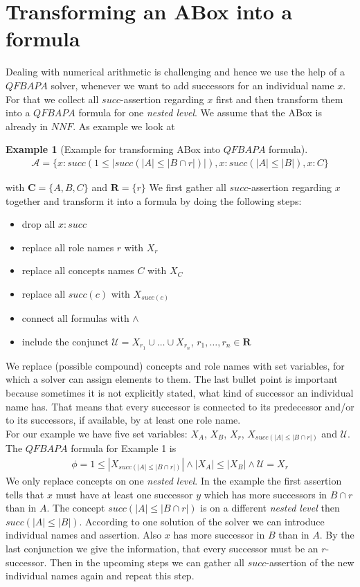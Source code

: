 \documentclass{book}
\theoremstyle{break}
\theoremstyle{definition}
\newtheorem{ex}{Example}
\begin{document}
\section{Transforming an ABox into a formula}
Dealing with numerical arithmetic is challenging and hence we use the help of a $QFBAPA$ solver, whenever we want to add successors for an individual name $x$. For that we collect all $succ$-assertion regarding $x$ first and then transform them into a $QFBAPA$ formula for one \textit{nested level}. We assume that the ABox is already in $NNF$. As example we look at
\begin{ex}[Example for transforming ABox into $QFBAPA$ formula]
\begin{align*}
\mathcal{A}=\{x:succ(1\leq|succ(|A|\leq|B\cap r|)|), x:succ(|A|\leq |B|), x:C\}
\end{align*}
\end{ex}
with $\mathbf{C}=\{A,B,C\}$ and $\mathbf{R}=\{r\}$
We first gather all $succ$-assertion regarding $x$ together and transform it into a formula by doing the following steps:
\begin{itemize}
\item drop all $x:succ$
\item replace all role names $r$ with $X_r$
\item replace all concepts names $C$ with $X_C$
\item replace all $succ(c)$ with $X_{succ(c)}$
\item connect all formulas with $\wedge$
\item include the conjunct $\mathcal{U}=X_{r_1}\cup\dots\cup X_{r_n}$, $r_1,\dots, r_n\in\mathbf{R}$
\end{itemize}
We replace (possible compound) concepts and role names with set variables, for which a solver can assign elements to them. The last bullet point is important because sometimes it is not explicitly stated, what kind of successor an individual name has. That means that every successor is connected to its predecessor and/or to its successors, if available, by at least one role name.\\
For our example we have five set variables: $X_A$, $X_B$, $X_r$, $X_{succ(|A|\leq |B\cap r|)}$ and $\mathcal{U}$. The $QFBAPA$ formula for Example 1 is 
\begin{align}\label{f}
\phi=1\leq |X_{succ(|A|\leq |B\cap r|)}|\wedge |X_A|\leq |X_B|\wedge \mathcal{U}=X_r
\end{align}
We only replace concepts on one \textit{nested level}. In the example the first assertion tells that $x$ must have at least one successor $y$ which has more successors in $B\cap r$ than in $A$. The concept $succ(|A|\leq|B\cap r|)$ is on a different \textit{nested level} then $succ(|A|\leq |B|)$. According to one solution of the solver we can introduce individual names and assertion. Also $x$ has more successor in $B$ than in $A$. By the last conjunction we give the information, that every successor must be an $r$-successor. Then in the upcoming steps we can gather all $succ$-assertion of the new individual names again and repeat this step.
\end{document}

